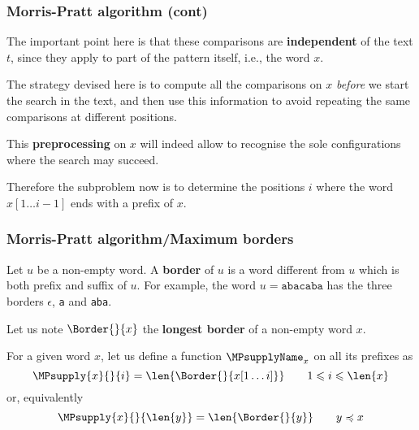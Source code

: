 %
\begin{frame}
\frametitle{Morris-Pratt algorithm (cont)}

The important point here is that these comparisons are
\textbf{independent} of the text \(t\), since they apply to part of
the pattern itself, i.e., the word \(x\).

\bigskip

The strategy devised here is to compute all the comparisons on \(x\)
\emph{before} we start the search in the text, and then use this
information to avoid repeating the same comparisons at different
positions.

\bigskip

This \textbf{preprocessing} on \(x\) will indeed allow to recognise
the sole configurations where the search may succeed.

\bigskip

Therefore the subproblem now is to determine the positions \(i\) where
the word \(x[1 \dots i-1]\) ends with a prefix of \(x\).

\end{frame}

%
\begin{frame}
\frametitle{Morris-Pratt algorithm/Maximum borders}

\label{MP_supply_def}

Let \(u\) be a non-empty word. A \textbf{border} of \(u\) is a word
different from \(u\) which is both prefix and suffix of \(u\). For
example, the word \(u = \texttt{abacaba}\) has the three borders
\(\epsilon\), \texttt{a} and \texttt{aba}.

\bigskip

Let us note \(\Border{}{x}\) the \textbf{longest border} of a non-empty
word \(x\). 

\bigskip

For a given word \(x\), let us define a function \(\MPsupplyName_{x}\) on
all its prefixes as
\[
  \MPsupply{x}{}{i} = \len{\Border{}{x[1 \dots i]}} 
  \qquad 1 \leqslant i \leqslant \len{x}
\]
or, equivalently
\[
\MPsupply{x}{}{\len{y}} = \len{\Border{}{y}} \qquad y \preccurlyeq x
\]

\end{frame}

